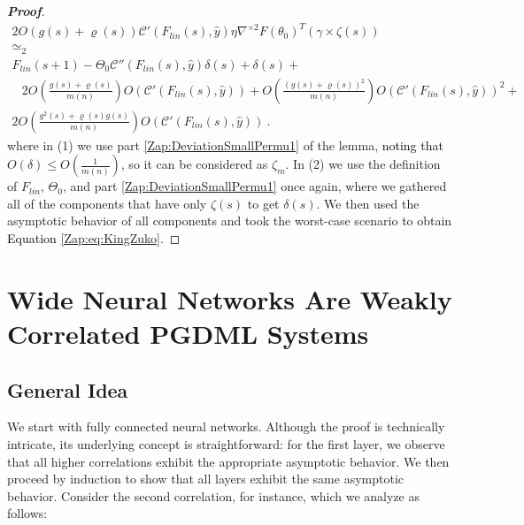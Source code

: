 \documentclass{article} %
\begin{document}
\begin{proof}[\textbf{Proof}]
\begin{equation}
\begin{array}{c}
2O\left(g\left(s\right)+\varrho\left(s\right)\right)\mathcal{C}'\left(F_{lin}\left(s\right),\hat{y}\right)\eta\nabla^{\times2}F\left(\theta_{0}\right)^{T}\left(\gamma\times\zeta\left(s\right)\right)\\
\simeq_{2}\\
F_{lin}\left(s+1\right)-\Theta_{0}\mathcal{C}''\left(F_{lin}\left(s\right),\hat{y}\right)\delta\left(s\right)+\delta\left(s\right)+\\
\begin{array}{c}
\\
\\
\end{array}2O\left(\frac{g\left(s\right)+\varrho\left(s\right)}{m\left(n\right)}\right)O\left(\mathcal{C}'\left(F_{lin}\left(s\right),\hat{y}\right)\right)+O\left(\frac{\left(g\left(s\right)+\varrho\left(s\right)\right)^{2}}{m\left(n\right)}\right)O\left(\mathcal{C}'\left(F_{lin}\left(s\right),\hat{y}\right)\right)^{2}+\\
2O\left(\frac{g^{2}\left(s\right)+\varrho\left(s\right)g\left(s\right)}{m\left(n\right)}\right)O\left(\mathcal{C}'\left(F_{lin}\left(s\right),\hat{y}\right)\right) \ .
\end{array}
\end{equation}
where in (1) we use part \ref{Zap:DeviationSmallPermu1} of the lemma, \textcolor{black}{noting that} \(O(\delta)\leq O\left(\frac{1}{m(n)}\right)\), so it can be considered as \(\zeta_m\). In (2) we use the definition of \(F_{lin}\), \(\Theta_0\), and part \ref{Zap:DeviationSmallPermu1} once again, where we gathered all of the components that have only \(\zeta(s)\) to get \(\delta(s)\). We then used the asymptotic behavior of all components and took the worst-case scenario to obtain \textcolor{black}{Equation} \ref{Zap:eq:KingZuko}.
\end{proof}

\section{Wide Neural Networks Are Weakly Correlated PGDML Systems}
\label{zap:sec:WideNNAreLowCor}

\subsection{General Idea}

We start with fully connected neural networks.
Although the proof is technically intricate, its underlying concept is straightforward:
for the first layer, we observe that all higher correlations exhibit the appropriate asymptotic behavior.
We then proceed by induction to show that all layers exhibit the same asymptotic behavior.
Consider the second correlation, for instance, which we analyze as follows:
\end{document}
